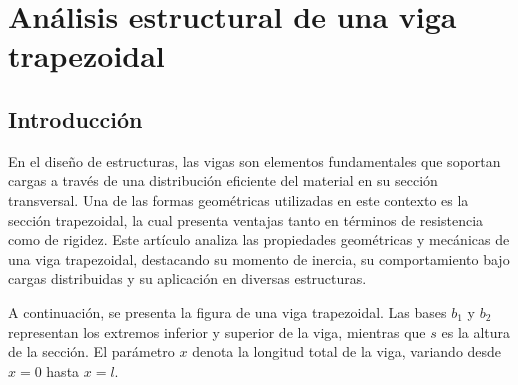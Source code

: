 \chapter{Análisis estructural de una viga trapezoidal}

\section{Introducción}

En el diseño de estructuras, las vigas son elementos fundamentales que soportan cargas a través de una distribución eficiente del material en su sección transversal. Una de las formas geométricas utilizadas en este contexto es la sección trapezoidal, la cual presenta ventajas tanto en términos de resistencia como de rigidez. Este artículo analiza las propiedades geométricas y mecánicas de una viga trapezoidal, destacando su momento de inercia, su comportamiento bajo cargas distribuidas y su aplicación en diversas estructuras.

A continuación, se presenta la figura de una viga trapezoidal. Las bases $b_1$ y $b_2$ representan los extremos inferior y superior de la viga, mientras que $s$ es la altura de la sección. El parámetro $x$ denota la longitud total de la viga, variando desde $x=0$ hasta $x=l$.

\begin{center}
\end{center}

